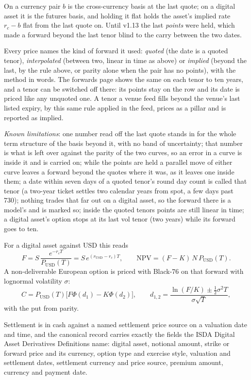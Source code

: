 \documentclass[11pt,a4paper]{article}
\begin{document}
On a currency pair $b$ is the cross-currency basis at the last quote; on a digital asset it is the futures basis, and holding it flat holds the asset's implied rate $r_c-b$ flat from the last quote on. Until v1.13 the last \emph{points} were held, which made a forward beyond the last tenor blind to the carry between the two dates.

Every price names the kind of forward it used: \emph{quoted} (the date is a quoted tenor), \emph{interpolated} (between two, linear in time as above) or \emph{implied} (beyond the last, by the rule above, or parity alone when the pair has no points), with the method in words. The forwards page shows the same on each tenor to ten years, and a tenor can be switched off there: its points stay on the row and its date is priced like any unquoted one. A tenor a venue feed fills beyond the venue's last listed expiry, by this same rule applied in the feed, prices as a pillar and is reported as implied.

\emph{Known limitations}: one number read off the last quote stands in for the whole term structure of the basis beyond it, with no band of uncertainty; that number is what is left over against the parity of the two curves, so an error in a curve is inside it and is carried on; while the points are held a parallel move of either curve leaves a forward beyond the quotes where it was, as it leaves one inside them; a date within seven days of a quoted tenor's round day count is called that tenor (a two-year ticket settles two calendar years from spot, a few days past 730); nothing trades that far out on a digital asset, so the forward there is a model's and is marked so; inside the quoted tenors points are still linear in time; a digital asset's option stops at its last vol tenor (two years) while its forward goes to ten.

For a digital asset against USD this reads
\begin{equation}
F = S\,\frac{e^{-r_cT}}{P_{\mathrm{USD}}(T)} = S\,e^{(r_{\mathrm{USD}}-r_c)T},\qquad \mathrm{NPV} = (F-K)\,N\,P_{\mathrm{USD}}(T).
\end{equation}
A non-deliverable European option is priced with Black-76 on that forward with lognormal volatility $\sigma$:
\begin{equation}
C = P_{\mathrm{USD}}(T)\big[F\Phi(d_1)-K\Phi(d_2)\big],\qquad d_{1,2}=\frac{\ln(F/K)\pm\tfrac12\sigma^2T}{\sigma\sqrt T},
\end{equation}
with the put from parity.

Settlement is in cash against a named settlement price source on a valuation date and time, and the canonical record carries exactly the fields the ISDA Digital Asset Derivatives Definitions name: digital asset, notional amount, strike or forward price and its currency, option type and exercise style, valuation and settlement dates, settlement currency and price source, premium amount, currency and payment date.
\end{document}
